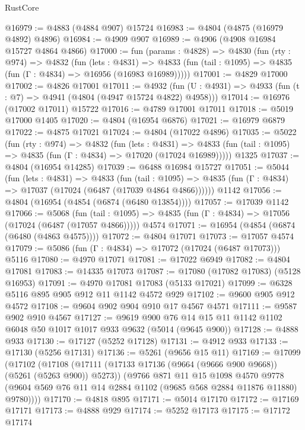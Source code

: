 \begin{lexlean}{RustCore}
\begin{coremodule}
@16979 := @4883 (@4884 @907) @15724
@16983 := @4804 (@4875 (@16979 @4892) @4896)
@16984 := @4909 @907
@16989 := @4906 (@4908 @16984 @15727 @4864 @4866)
@17000 := fun (params : @4828) =>
  @4830
    (fun (rty : @974) =>
    @4832
      (fun (lets : @4831) =>
      @4833 (fun (tail : @1095) => @4835 (fun (Γ : @4834) => @16956 (@16983 @16989)))))
@17001 := @4829 @17000
@17002 := @4826 @17001
@17011 := @4932
    (fun (U : @4931) => @4933 (fun (t : @7) => @4941 (@4804 (@4947 @15724 @4822) @4958)))
@17014 := @16976 (@17002 @17011) @15722
@17016 := @4789 @17001 @17011
@17018 := @5019 @17000 @1405
@17020 := @4804 (@16954 @6876)
@17021 := @16979 @6879
@17022 := @4875 @17021
@17024 := @4804 (@17022 @4896)
@17035 := @5022
    (fun (rty : @974) =>
    @4832
      (fun (lets : @4831) =>
      @4833 (fun (tail : @1095) => @4835 (fun (Γ : @4834) => @17020 (@17024 @16989)))))
    @1325
@17037 := @4804 (@16954 @14285)
@17039 := @6488 @16984 @15727
@17051 := @5044
    (fun (lets : @4831) =>
    @4833
      (fun (tail : @1095) =>
      @4835 (fun (Γ : @4834) => @17037 (@17024 (@6487 (@17039 @4864 @4866))))))
    @1142
@17056 := @4804 (@16954 (@4854 (@6874 (@6480 @13854))))
@17057 := @17039 @1142
@17066 := @5068
    (fun (tail : @1095) => @4835 (fun (Γ : @4834) => @17056 (@17024 (@6487 (@17057 @4866)))))
    @4574
@17071 := @16954 (@4854 (@6874 (@6480 (@4863 @4575))))
@17072 := @4804 @17071
@17073 := @17057 @4574
@17079 := @5086 (fun (Γ : @4834) => @17072 (@17024 (@6487 @17073))) @5116
@17080 := @4970 @17071
@17081 := @17022 @6949
@17082 := @4804 @17081
@17083 := @14335 @17073
@17087 := @17080 (@17082 @17083) (@5128 @16953)
@17091 := @4970 @17081 @17083 (@5133 @17021)
@17099 := @6328 @5116 @895 @905 @912 @11 @1142 @4572 @929
@17102 := @9600 @905 @912 @4572
@17108 := @9604 @902 @904 @910 @17 @4567 @4571
@17111 := @9587 @902 @910 @4567
@17127 := @9619
    @900
    @76
    @14
    @15
    @11
    @1142
    @1102
    @6048
    @50
    @1017
    @1017
    @933
    @9632
    (@5014 (@9645 @900))
@17128 := @4888 @933
@17130 := @17127 (@5252 @17128)
@17131 := @4912 @933
@17133 := @17130 (@5256 @17131)
@17136 := @5261 (@9656 @15 @11)
@17169 := @17099
    (@17102
      (@17108
        (@17111 (@17133 @17136 (@9664 (@9666 @900 @9668)) (@5261 (@5263 @900)) @5273))
        (@9766
          @871
          @11
          @15
          @1098
          @4570
          @9778
          (@9604 @569 @76 @11 @14 @2884 @1102 (@9685 @568 @2884 @11876 @11880) @9780))))
@17170 := @4818 @895
@17171 := @5014 @17170
@17172 := @17169 @17171
@17173 := @4888 @929
@17174 := @5252 @17173
@17175 := @17172 @17174

\end{coremodule}
\end{lexlean}
